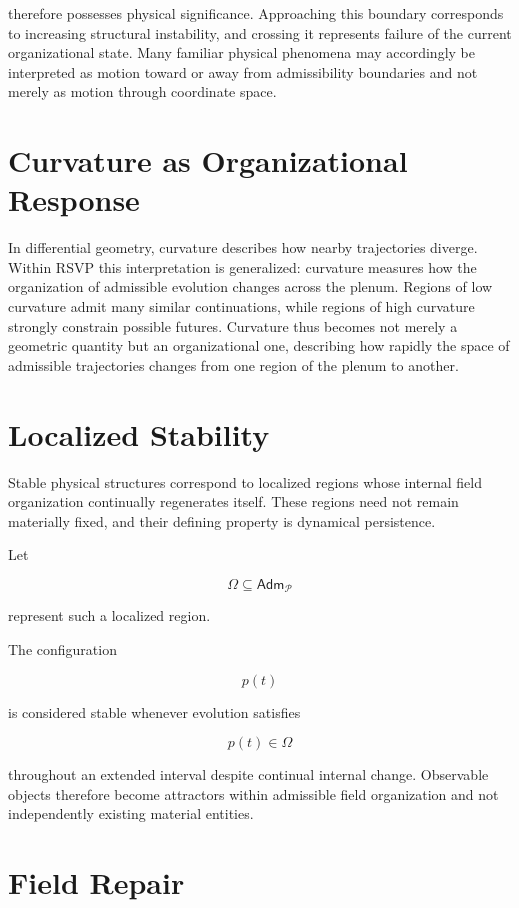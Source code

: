 \documentclass[11pt,oneside]{book}
\numberwithin{equation}{chapter}
\theoremstyle{definition}
\theoremstyle{plain}
\newcommand{\Adm}{\mathsf{Adm}}
\begin{document}
therefore possesses physical significance. Approaching this boundary corresponds to increasing structural instability, and crossing it represents failure of the current organizational state. Many familiar physical phenomena may accordingly be interpreted as motion toward or away from admissibility boundaries and not merely as motion through coordinate space.

\section{Curvature as Organizational Response}

In differential geometry, curvature describes how nearby trajectories diverge. Within RSVP this interpretation is generalized: curvature measures how the organization of admissible evolution changes across the plenum. Regions of low curvature admit many similar continuations, while regions of high curvature strongly constrain possible futures. Curvature thus becomes not merely a geometric quantity but an organizational one, describing how rapidly the space of admissible trajectories changes from one region of the plenum to another.

\section{Localized Stability}

Stable physical structures correspond to localized regions whose internal field organization continually regenerates itself. These regions need not remain materially fixed, and their defining property is dynamical persistence.

Let

\[
\Omega
\subseteq
\Adm_{\mathcal P}
\]

represent such a localized region.

The configuration

\[
p(t)
\]

is considered stable whenever evolution satisfies

\[
p(t)
\in
\Omega
\]

throughout an extended interval despite continual internal change. Observable objects therefore become attractors within admissible field organization and not independently existing material entities.

\section{Field Repair}
\end{document}
